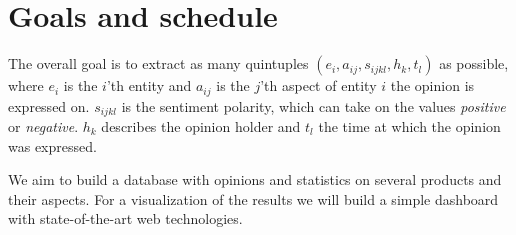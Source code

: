 \documentclass[10pt,a4paper]{article}
\begin{document}
	\section{Goals and schedule}
	The overall goal is to extract as many quintuples $(e_i, a_{ij}, s_{ijkl}, h_k, t_l)$ as possible, where $e_i$ is the $i$'th entity and $a_{ij}$ is the $j$'th aspect of entity $i$ the opinion is expressed on. $s_{ijkl}$ is the sentiment polarity, which can take on the values \textit{positive} or \textit{negative}. $h_k$ describes the opinion holder and $t_l$ the time at which the opinion was expressed.
	
	We aim to build a database with opinions and statistics on several products and their aspects. For a visualization of the results we will build a simple dashboard with state-of-the-art web technologies.

	\newpage

	\nocite{DBLP:journals/corr/AndorAWSPGPC16}
	\nocite{Liu12sentimentanalysis}
	\nocite{Zhang2014}
	\nocite{pennington2014glove}
	\nocite{syntaxnet}
	\nocite{Ding:2008:HLA:1341531.1341561}
	\nocite{Hu:2004:MSC:1014052.1014073}
	\nocite{hongsentiment}

	
	
\end{document}
